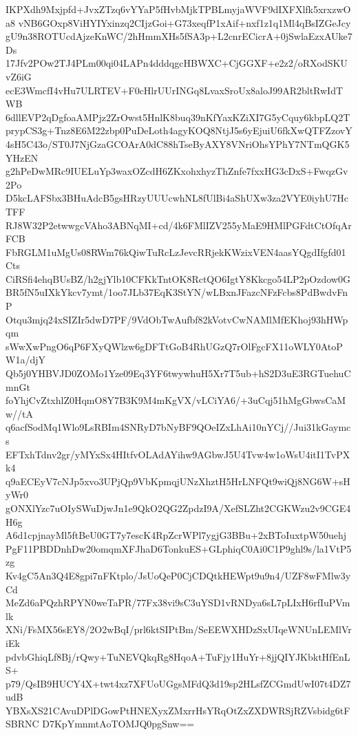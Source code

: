 IKPXdh9Mxjpfd+JvxZTzq6vYYaP5fHvbMjkTPBLmyjaWVF9dIXFXlfk5xrxzwOa8
vNB6GOxp8ViHYIYxinzq2CIjzGoi+G73xeqfP1xAif+nxf1z1q1Ml4qBsIZGeJcy
gU9n38ROTUcdAjzeKnWC/2hHmmXHs5fSA3p+L2cnrECicrA+0jSwlaEzxAUke7Ds
17Jfv2POw2TJ4PLm00qi04LAPn4dddqgcHBWXC+CjGGXF+e2z2/oRXodSKUvZ6iG
ecE3WmcfI4vHu7ULRTEV+F0cHlrUUrINGq8LvaxSroUx8aloJ99AR2bltRwIdTWB
6dllEVP2qDgfoaAMPjz2ZrOwst5HnlK8buq39nKfYaxKZiXI7G5yCquy6kbpLQ2T
prypCS3g+Tnz8E6M22zbp0PuDeLoth4agyKOQ8NtjJ5s6yEjuiU6fkXwQTFZzovY
4sH5C43o/ST0J7NjGzaGCOArA0dC88hTseByAXY8VNriOhsYPhY7NTmQGK5YHzEN
g2hPeDwMRc9IUELuYp3waxOZcdH6ZKxohxhyzThZnfe7fxxHG3cDxS+FwqzGv2Po
D5kcLAFSbx3BHuAdcB5gsHRzyUUUcwhNL8fUlBi4aShUXw3za2VYE0iyhU7HcTFF
RJ8W32P2etwwgcVAho3ABNqMI+cd/4k6FMlIZV255yMaE9HMlPGFdtCtOfqArFCB
FbRGLM1uMgUs08RWm76kQiwTuRcLzJevcRRjekKWzixVEN4aasYQgdIfgfd01Cts
CiRSfi4ehqBUsBZ/h2gjYlb10CFKkTntOK8RctQO6IgtY8Kkcgo54LP2pOzdow0G
BR5fN5uIXkYkcv7ymt/1oo7JLb37EqK3StYN/wLBxnJFazcNFzFcbs8PdBwdvFnP
Otqu3mjq24xSIZIr5dwD7PF/9VdObTwAufbf82kVotvCwNAMlMfEKhoj93hHWpqm
sWwXwPngO6qP6FXyQWlzw6gDFTtGoB4RhUGzQ7rOlFgcFX11oWLY0AtoPW1a/djY
Qb5j0YHBVJD0ZOMo1Yze09Eq3YF6twywhuH5Xr7T5ub+hS2D3uE3RGTuehuCmnGt
foYhjCvZtxhlZ0HqmO8Y7B3K9M4mKgVX/vLCiYA6/+3uCqj51hMgGbwsCaMw//tA
q6acfSodMq1Wlo9LsRBIm4SNRyD7bNyBF9QOeIZxLhAi10nYCj//Jui31kGaymcs
EFTxhTdnv2gr/yMYxSx4HItfvOLAdAYihw9AGbwJ5U4Tvw4w1oWsU4itI1TvPXk4
q9aECEyV7cNJp5xvo3UPjQp9VbKpmqjUNzXhztH5HrLNFQt9wiQj8NG6W+sHyWr0
gONXlYzc7uOIySWuDjwJn1e9QkO2QG2ZpdzI9A/XefSLZht2CGKWzu2v9CGE4H6g
A6d1cpjnayMl5ftBeU0GT7y7escK4RpZcrWPl7ygjG3BBu+2xBToIuxtpW50uehj
PgF11PBDDnhDw20omqmXFJhaD6TonkuES+GLphiqC0Ai0C1P9ghl9s/la1VtP5zg
Kv4gC5An3Q4E8gpi7nFKtplo/JsUoQeP0CjCDQtkHEWpt9u9n4/UZF8wFMlw3yCd
MeZd6aPQzhRPYN0weTaPR/77Fx38vi9sC3uYSD1vRNDya6sL7pLIxH6rfIuPVmlk
XNi/FsMX56sEY8/2O2wBqI/prl6ktSIPtBm/SeEEWXHDzSxUIqeWNUnLEMlVriEk
pdvbGhiqLf8Bj/rQwy+TuNEVQkqRg8HqoA+TuFjy1HuYr+8jjQIYJKbktHfEnLS+
p79/QsIB9HUCY4X+twt4xz7XFUoUGgsMFdQ3d19sp2HLsfZCGmdUwI07t4DZ7udB
YBXsXS21CAvuDPlDGowPtHNEXyxZMxrrHsYRqOtZxZXDWRSjRZVsbidg6tFSBRNC
D7KpYmnmtAoTOMJQ0pgSnw==
